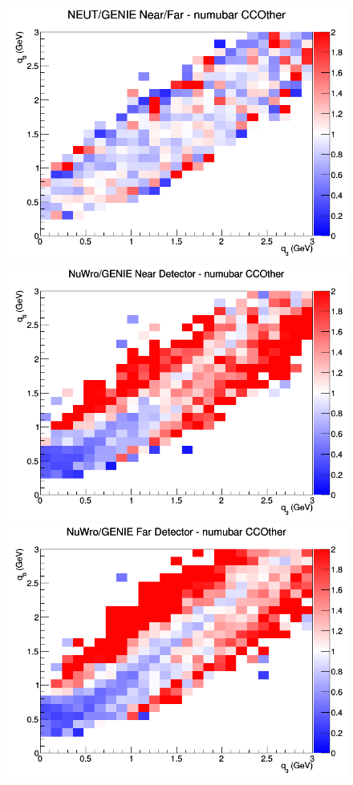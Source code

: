 \documentclass[12pt]{article}
\begin{document}
\begin{figure}[h]
\endminipage
{}
\includegraphics[width=\linewidth]{eff_q0_q3/LAr/ratios/CCOther_NEUT_GENIE_numubar_NF_q3_q0.png}
\endminipage
\newline
{}
\includegraphics[width=\linewidth]{eff_q0_q3/LAr/ratios/CCOther_NuWro_GENIE_numubar_near_q3_q0.png}
\endminipage
{}
\includegraphics[width=\linewidth]{eff_q0_q3/LAr/ratios/CCOther_NuWro_GENIE_numubar_far_q3_q0.png}

\end{figure}
\end{document}
